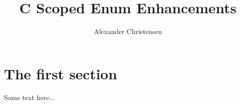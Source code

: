 \documentclass[
  format=manuscript,
  screen=true,
  review=false,
  nonacm=true,
  timestamp=true,
  balance=false]{acmart}
\author{Alexander Christensen}
\title{C Scoped Enum Enhancements}
\begin{document}

\maketitle

\section{The first section}

Some text here...





\end{document}
